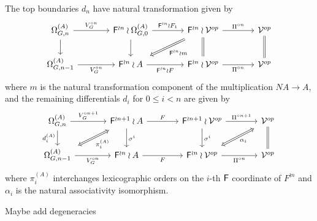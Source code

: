 \documentclass[a4paper,10pt]{article}%
\begin{document}
The top boundaries $d_n$ have natural transformation given by
\begin{equation}
  \begin{tikzcd}[column sep=3.7em]
    \Omega_{G,n}^{(A)} \ar{d} \ar{r}{V_G^{\circ n}} &
    \Fin^{\wr n} \wr \Omega_{G,0}^{(A)} \ar{r}{\Fin^{\wr n}\wr F_1} \ar{d}&
    |[alias=dog2]|
    \Fin^{\wr n} \wr \mathcal{V}^{op} \ar{r}{\Pi^{\circ n}}  \ar[equal]{d} &
    \mathcal{V}^{op} \ar[equal]{d}
    \\
    \Omega_{G,n-1}^{(A)} \ar{r}[swap]{V_G^{\circ n}} &
    |[alias=cat3]|
    \Fin^{\wr n} \wr A \ar{r}[swap]{\Fin^{\wr n} \wr F} &
    \Fin^{\wr n} \wr \mathcal{V}^{op} \ar{r}[swap]{\Pi^{\circ n}} &
    |[alias=dog]|
    \mathcal{V}^{op}
    \arrow[Rightarrow, from=dog2, to=cat3,shorten <=0.15cm,,shorten >=0.15cm,"\Fin^{\wr n} \wr m"]
  \end{tikzcd}
\end{equation}
where $m$ is the natural transformation component of the multiplication $NA \to A$, and the remaining differentials
$d_i$ for $0 \leq i < n$ are given by
\begin{equation}\label{REMAINDIFF EQ}
  \begin{tikzcd}[column sep=3.7em]
    \Omega_{G,n}^{(A)} \ar{d}[swap]{d_i^{(A)}} \ar{r}{V_G^{\circ n + 1}} &
    |[alias=dog2]|
    \Fin^{\wr n+1} \wr A \ar{r}{F} \ar{d}{\sigma^i}&
    \Fin^{\wr n+1} \wr \mathcal{V}^{op} \ar{r}{\Pi^{\circ n+1}}  \ar{d}{\sigma^i} &
    |[alias=dog3]|
    \mathcal{V}^{op} \ar[equal]{d}
    \\
    |[alias=cat2]|
    \Omega_{G,n-1}^{(A)} \ar{r}[swap]{V_G^{\circ n}} &
    \Fin^{\wr n} \wr A \ar{r}[swap]{F} &
    |[alias=cat3]|
    \Fin^{\wr n} \wr \mathcal{V}^{op} \ar{r}[swap]{\Pi^{\circ n}} &
    |[alias=dog]|
    \mathcal{V}^{op}
    \arrow[Leftrightarrow, from=dog2, to=cat2,shorten <=0.15cm,,shorten >=0.15cm,"\pi_i^{(A)}"]
    \arrow[Leftrightarrow, from=dog3, to=cat3,shorten <=0.15cm,,shorten >=0.15cm,"\alpha_i"]
  \end{tikzcd}
\end{equation}
where $\pi_i^{(A)}$ interchanges lexicographic orders on the $i$-th $\mathsf{F}$ coordinate of $F^{\wr n}$ and $\alpha_i$ is the natural associativity isomorphism.

{\color{blue} Maybe add degeneracies}
\end{document}
